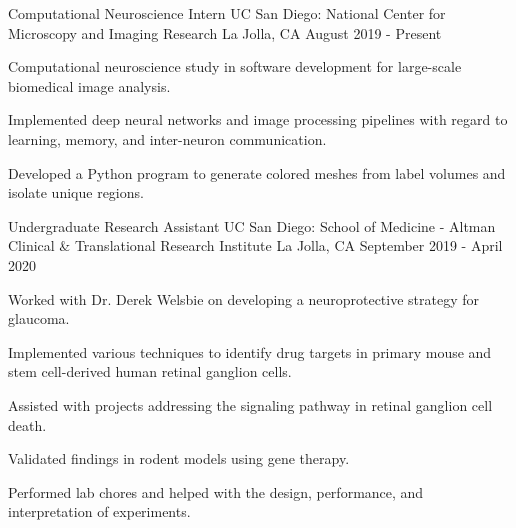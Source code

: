 \begin{cventries}
{\begin{cvitems}
  \end{cvitems}
}
\cventry
{Computational Neuroscience Intern} %
{UC San Diego: National Center for Microscopy and Imaging Research} %
{La Jolla, CA} %
{August 2019 - Present} %
{
  \begin{cvitems} %
    \item {Computational neuroscience study in software development for large-scale biomedical image analysis.}
    \item {Implemented deep neural networks and image processing pipelines with regard to learning, memory, and inter-neuron communication.}
    \item {Developed a Python program to generate colored meshes from label volumes and isolate unique regions.}
  \end{cvitems}
}
  \cventry
    {Undergraduate Research Assistant} %
    {UC San Diego: School of Medicine - Altman Clinical \& Translational Research Institute} %
    {La Jolla, CA} %
    {September 2019 - April 2020} %
    {
      \begin{cvitems} %
        \item {Worked with Dr. Derek Welsbie on developing a neuroprotective strategy for glaucoma.}
        \item {Implemented various techniques to identify drug targets in primary mouse and stem cell-derived human retinal ganglion cells.}
        \item {Assisted with projects addressing the signaling pathway in retinal ganglion cell death.}
        \item {Validated findings in rodent models using gene therapy.}
        \item {Performed lab chores and helped with the design, performance, and interpretation of experiments.}
      \end{cvitems}
    }
\end{cventries}

